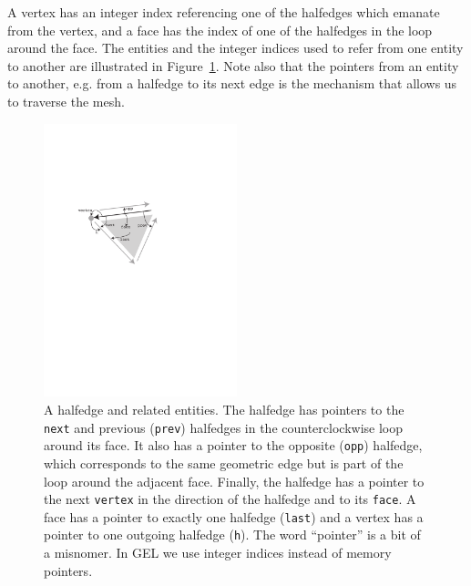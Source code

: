 \documentclass[a4paper]{article}
\begin{document}
A vertex has an integer index referencing one of the halfedges which emanate from the vertex, and a face has the index of one of the halfedges in the loop around the face. The entities and the integer indices used to refer from one entity to another are illustrated in Figure~\ref{fig:halfedge}. Note also that the pointers from an entity to another, e.g. from a halfedge to its next edge is the mechanism that allows us to traverse the mesh.
\begin{figure}[h!]
\centering
\includegraphics[width=0.5\textwidth]{halfedge-entities.pdf}
\caption{A halfedge and related entities. The halfedge has pointers to the \texttt{next} and previous (\texttt{prev}) halfedges in the counterclockwise loop around its face. It also has a pointer to the opposite (\texttt{opp}) halfedge, which corresponds to the same geometric edge but is part of the loop around the adjacent face. Finally, the halfedge has a pointer to the next \texttt{vertex} in the direction of the halfedge and to its \texttt{face}. A face has a pointer to exactly one halfedge (\texttt{last}) and a vertex has a pointer to one outgoing halfedge (\texttt{h}). The word ``pointer'' is a bit of a misnomer. In GEL we use integer indices instead of memory pointers. }
\label{fig:halfedge}
\end{figure}
\end{document}
